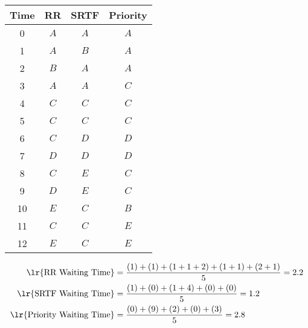 \begin{latin}
\begin{center}
\begin{tabular}{|c|c|c|c|}
    \hline
    Time & RR & SRTF & Priority\\
    \hline
    0 & $A$ & $A$ & $A$ \\
    1 & $A$ & $B$ & $A$ \\
    2 & $B$ & $A$ & $A$ \\
    3 & $A$ & $A$ & $C$ \\
    4 & $C$ & $C$ & $C$ \\
    5 & $C$ & $C$ & $C$ \\
    6 & $C$ & $D$ & $D$ \\
    7 & $D$ & $D$ & $D$ \\
    8 & $C$ & $E$ & $C$ \\
    9 & $D$ & $E$ & $C$ \\
    10 & $E$ & $C$ & $B$ \\
    11 & $C$ & $C$ & $E$ \\
    12 & $E$ & $C$ & $E$ \\
    \hline
\end{tabular}
\end{center}
\end{latin}
\begin{align*}
    \text{\lr{RR Waiting Time}} &= \frac{(1) + (1) + (1 + 1 + 2) + (1 + 1) + (2 + 1)}{5} = 2.2\\
    \text{\lr{SRTF Waiting Time}} &= \frac{(1) + (0) + (1 + 4) + (0) + (0)}{5} = 1.2\\
    \text{\lr{Priority Waiting Time}} &= \frac{(0) + (9) + (2) + (0) + (3)}{5} = 2.8
\end{align*}